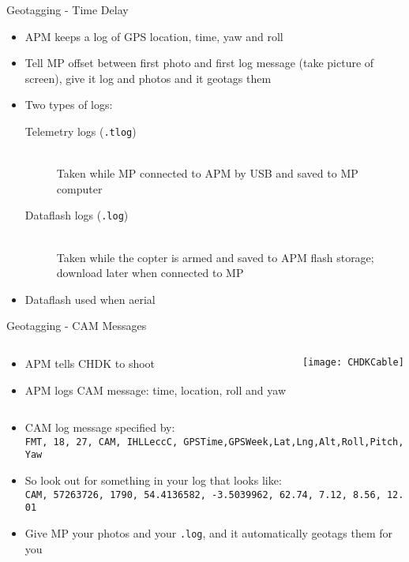 \documentclass[table]{beamer}
\begin{document}
\begin{frame}{Geotagging - Time Delay}
    \begin{itemize}
        \item APM keeps a log of GPS location, time, yaw and roll
        \item Tell MP offset between first photo and first log message (take
            picture of screen), give it log and photos and it geotags them
        \item Two types of logs:
            \begin{description}
                \item[Telemetry logs (\texttt{.tlog})] \hfill \\
                    Taken while MP connected to APM by USB and saved to MP
                    computer
                \item[Dataflash logs (\texttt{.log})] \hfill \\
                    Taken while the copter is armed and saved to APM flash
                    storage; download later when connected to MP
            \end{description}
        \item Dataflash used when aerial
    \end{itemize}
\end{frame}

\begin{frame}{Geotagging - CAM Messages}
    \begin{columns}[T]
        \begin{column}[T]{5cm}
            \begin{itemize}
                \item APM tells CHDK to shoot
                \item APM logs CAM message: time, location, roll and yaw
            \end{itemize}
        \end{column}
        \begin{column}[T]{5cm}
            \texttt{[image: CHDKCable]}
        \end{column}
    \end{columns}
    \begin{itemize}
        \item CAM log message specified by: \\
            {\scriptsize\texttt{FMT,~18,~27,~CAM,~IHLLeccC,~GPSTime,GPSWeek,Lat,Lng,Alt,Roll,Pitch,Yaw}}
        \item So look out for something in your log that looks like: \\
            {\scriptsize\texttt{CAM,~57263726,~1790,~54.4136582,~-3.5039962,~62.74,~7.12,~8.56,~12.01}}
        \item Give MP your photos and your \texttt{.log}, and it
            automatically geotags them for you
    \end{itemize}
\end{frame}
\end{document}
